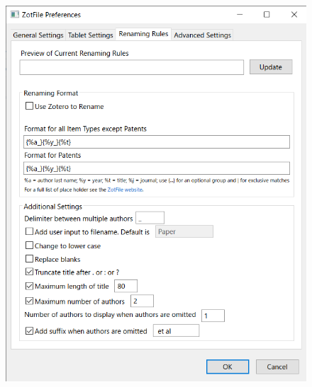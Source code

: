 \documentclass[a4paper,pdftex]{article}
\begin{document}
\begin{figure}[ht]
\begin{minipage}[ht]{0.19\columnwidth}
  \end{minipage}
  \begin{minipage}[ht]{0.19\columnwidth}
    \centering
    \includegraphics[width=\columnwidth]{fig/zotero14.png}
  \end{minipage}  
  \begin{minipage}[ht]{0.19\columnwidth}
    \centering

\end{minipage}
\end{figure}
\end{document}
